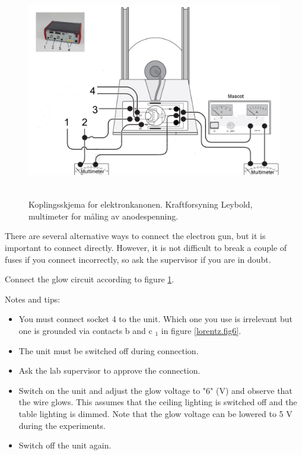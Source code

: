\documentclass[../Elmag-labhefte-2020.tex]{subfiles}
\begin{document}
\begin{figure}[!ht]
    \centering
    \includegraphics[width=14cm,height=9.49cm,keepaspectratio]{fig/Lorentz03-New.pdf}
    \caption{%
        Koplingsskjema for elektronkanonen. Kraftforsyning Leybold, multimeter for måling av anodespenning.
    }
    \label{lorentz.fig7}
\end{figure}

There are several alternative ways to connect the electron gun, but it is important to connect directly. However, it is not difficult to break a couple of fuses if you connect incorrectly, so ask the supervisor if you are in doubt.

{\itsf Connect the glow circuit according to figure \ref{lorentz.fig7}.}

Notes and tips:
\vspace{-4mm}
\begin{itemize}
    \item You must connect socket 4 to the unit. Which one you use is irrelevant but one is grounded via contacts b and c $_1$ in figure \ref{lorentz.fig6}.
    \item The unit must be switched off during connection.
    \item Ask the lab supervisor to approve the connection.
    \item Switch on the unit and adjust the glow voltage to "6" (V) and observe that the wire glows. This assumes that the ceiling lighting is switched off and the table lighting is dimmed. Note that the glow voltage can be lowered to 5 V during the experiments.
    \item Switch off the unit again.
\end{itemize}
\end{document}
